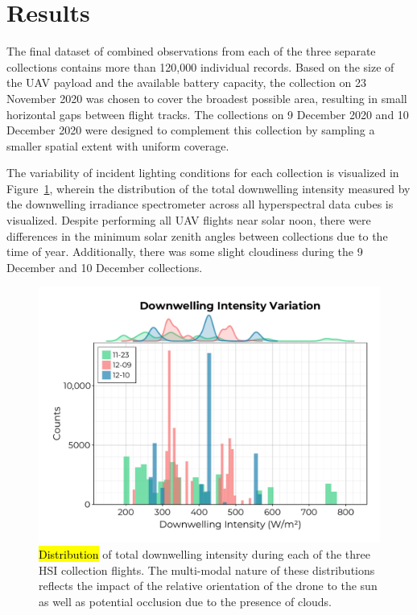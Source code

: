 \documentclass[remotesensing,article,accept,pdftex,moreauthors]{Definitions/mdpi}
\begin{document}
\section{Results}

The final dataset of combined observations from each of the three separate collections contains more than 120,000 individual records. Based on the size of the UAV payload and the available battery capacity, the collection on 23 November 2020 was chosen to cover the broadest possible area, resulting in small horizontal gaps between flight tracks. The collections on 9 December 2020 and 10 December 2020 were designed to complement this collection by sampling a smaller spatial extent with uniform coverage.

The variability of incident lighting conditions for each collection is visualized in Figure~\ref{fig:downwelling-hist}, wherein the distribution of the total downwelling intensity measured by the downwelling irradiance spectrometer across all hyperspectral data cubes is visualized. Despite performing all UAV flights near solar noon, there were differences in the minimum solar zenith angles between collections due to the time of year. Additionally, there was some slight cloudiness during the 9 December and 10 December collections. 

\begin{figure}[H]
\vspace{-0.1in}
\hspace{-9pt}\includegraphics[width=0.7\columnwidth]{figures/results/downwelling-hist.pdf}
\vspace{-0.15in}
\caption{\hl{Distribution} %
 of total downwelling intensity during each of the three HSI collection flights. The multi-modal nature of these distributions reflects the impact of the relative orientation of the drone to the sun as well as potential occlusion due to the presence of clouds.\label{fig:downwelling-hist}}
\end{figure}   
\end{document}
